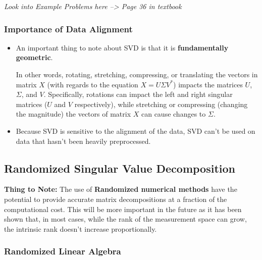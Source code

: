 \documentclass[11.5pt,a4paper]{article}
\begin{document}
\textit{Look into Example Problems here --> Page 36 in textbook}

\subsubsection*{Importance of Data Alignment}

\begin{itemize}
    \item An important thing to note about SVD is that it is \textbf{fundamentally geometric}. 
    
    In other words, rotating, stretching, compressing, or translating the vectors in matrix $X$ (with regards to the equation $X = U\Sigma V^*$) impacts the matrices $U$, $\Sigma$, and $V$. Specifically, rotations can impact the left and right singular matrices ($U$ and $V$ respectively), while stretching or compressing (changing the magnitude) the vectors of matrix $X$ can cause changes to $\Sigma$.

    \item Because SVD is sensitive to the alignment of the data, SVD can't be used on data that hasn't been heavily preprocessed.
\end{itemize}

\subsection*{Randomized Singular Value Decomposition}

\textbf{Thing to Note: }The use of \textbf{Randomized numerical methods} have the potential to provide accurate matrix decompositions at a fraction of the computational cost. This will be more important in the future as it has been shown that, in most cases, while the rank of the measurement space can grow, the intrinsic rank doesn't increase proportionally.

\subsubsection*{Randomized Linear Algebra}
\end{document}
